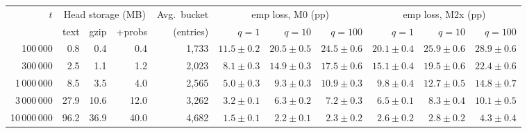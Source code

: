 \begin{tabular}{rrrrrrrrrrr}
\toprule
$t$ & \multicolumn{3}{c}{Head storage (MB)} & Avg.\ bucket & \multicolumn{3}{c}{emp loss, M0 (pp)} & \multicolumn{3}{c}{emp loss, M2x (pp)} \\
\cmidrule(lr){2-4}\cmidrule(lr){6-8}\cmidrule(lr){9-11}
 & text & gzip & +probs & (entries) & $q{=}1$ & $q{=}10$ & $q{=}100$ & $q{=}1$ & $q{=}10$ & $q{=}100$ \\
\midrule
100\,000 & 0.8 & 0.4 & 0.4 & 1,733 & $11.5 \pm 0.2$ & $20.5 \pm 0.5$ & $24.5 \pm 0.6$ & $20.1 \pm 0.4$ & $25.9 \pm 0.6$ & $28.9 \pm 0.6$ \\
300\,000 & 2.5 & 1.1 & 1.2 & 2,023 & $8.1 \pm 0.3$ & $14.9 \pm 0.3$ & $17.5 \pm 0.6$ & $15.1 \pm 0.4$ & $19.5 \pm 0.6$ & $22.4 \pm 0.6$ \\
1\,000\,000 & 8.5 & 3.5 & 4.0 & 2,565 & $5.0 \pm 0.3$ & $9.3 \pm 0.3$ & $10.9 \pm 0.3$ & $9.8 \pm 0.4$ & $12.7 \pm 0.5$ & $14.8 \pm 0.7$ \\
3\,000\,000 & 27.9 & 10.6 & 12.0 & 3,262 & $3.2 \pm 0.1$ & $6.3 \pm 0.2$ & $7.2 \pm 0.3$ & $6.5 \pm 0.1$ & $8.3 \pm 0.4$ & $10.1 \pm 0.5$ \\
10\,000\,000 & 96.2 & 36.9 & 40.0 & 4,682 & $1.5 \pm 0.1$ & $2.2 \pm 0.1$ & $2.3 \pm 0.2$ & $2.6 \pm 0.2$ & $2.8 \pm 0.2$ & $4.3 \pm 0.4$ \\
\bottomrule
\end{tabular}
